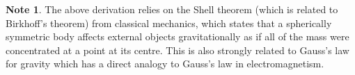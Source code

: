\documentclass[a4paper,12pt]{article}
\theoremstyle{remark}
\renewcommand{\=}[1]{\stackrel{#1}{=}} %
\theoremstyle{plain}
\theoremstyle{definition}
\newtheorem*{definitionT}{Note}%
\newenvironment{note}{
\begin{dBox}
\begin{definitionT}}
{\end{definitionT}
\end{dBox}}
\begin{document}
\begin{note}
The above derivation relies on the Shell theorem (which is related to Birkhoff's theorem) from classical mechanics, which states that a spherically symmetric body affects external objects gravitationally as if all of the mass were concentrated at a point at its centre. This is also strongly related to Gauss's law for gravity which has a direct analogy to Gauss's law in electromagnetism.%
\end{note}

\end{document}
